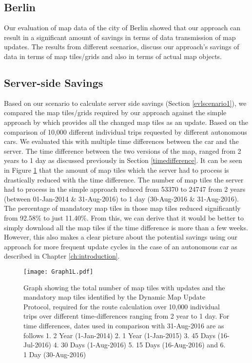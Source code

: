 \subsection{Berlin}


Our evaluation of map data of the city of Berlin showed that our approach can result in a significant amount of savings in terms of data transmission of map updates. The results from different scenarios, discuss our approach's savings of data in terms of map tiles/grids and also in terms of actual map objects. 





\subsection{Server-side Savings}
Based on our scenario to calculate server side savings (Section \ref{evlscenario1}), we compared the map tiles/grids required by our approach against the simple approach by \citet{bastiaensen2003actmap} which provides all the changed map tiles as an update. Based on the comparison of 10,000 different individual trips requested by different autonomous cars. We evaluated this with multiple time differences between the car and the server. 
The time difference between the two versions of the map, ranged from 2 years to 1 day as discussed previously in Section \ref{timedifference}. 
It can be seen in Figure \ref{fg:scenario1} that the amount of map tiles which the server had to process is drastically reduced with the time difference. The number of map tiles the server had to process in the simple approach reduced from 53370 to 24747 from 2 years (between 01-Jan-2014 \& 31-Aug-2016) to 1 day (30-Aug-2016 \& 31-Aug-2016). The percentage of mandatory map tiles in those map tiles reduced significantly from 92.58\% to just 11.40\%. From this, we can derive that it would be better to simply download all the map tiles if the time difference is more than a few weeks. However, this also makes a clear picture about the potential savings using our approach for more frequent update cycles in the case of an autonomous car as described in Chapter \ref{ch:introduction}. \\

\begin{figure}
\centering
\texttt{[image: Graph1L.pdf]}
\caption{Graph showing the total number of map tiles with updates and the mandatory map tiles identified by the Dynamic Map Update Protocol, required for the route calculation over 10,000 individual trips over different time-differences ranging from 2 year to 1 day. For time differences, dates used in comparison with 31-Aug-2016 are as follows 1. 2 Year (1-Jan-2014) 2. 1 Year (1-Jan-2015) 3. 45 Days (16-Jul-2016) 4. 30 Days (1-Aug-2016) 5. 15 Days (16-Aug-2016) and 6. 1 Day (30-Aug-2016)}
\label{fg:scenario1}
\end{figure}


